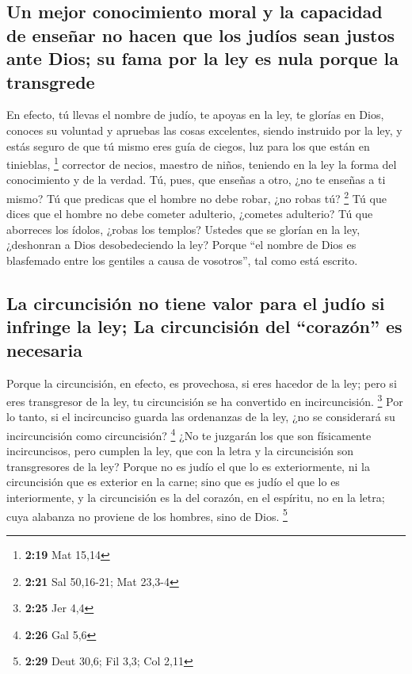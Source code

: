 \begin{paracol}{2}
\hypertarget{un-mejor-conocimiento-moral-y-la-capacidad-de-enseuxf1ar-no-hacen-que-los-juduxedos-sean-justos-ante-dios-su-fama-por-la-ley-es-nula-porque-la-transgrede}{%
\subsection{Un mejor conocimiento moral y la capacidad de enseñar no
hacen que los judíos sean justos ante Dios; su fama por la ley es nula
porque la
transgrede}\label{un-mejor-conocimiento-moral-y-la-capacidad-de-enseuxf1ar-no-hacen-que-los-juduxedos-sean-justos-ante-dios-su-fama-por-la-ley-es-nula-porque-la-transgrede}}

 En efecto, tú llevas el nombre de judío, te apoyas en la
ley, te glorías en Dios,  conoces su voluntad y apruebas
las cosas excelentes, siendo instruido por la ley,  y
estás seguro de que tú mismo eres guía de ciegos, luz para los que están
en tinieblas, \footnote{\textbf{2:19} Mat 15,14} 
corrector de necios, maestro de niños, teniendo en la ley la forma del
conocimiento y de la verdad.  Tú, pues, que enseñas a
otro, ¿no te enseñas a ti mismo? Tú que predicas que el hombre no debe
robar, ¿no robas tú? \footnote{\textbf{2:21} Sal 50,16-21; Mat 23,3-4}
 Tú que dices que el hombre no debe cometer adulterio,
¿cometes adulterio? Tú que aborreces los ídolos, ¿robas los templos?
 Ustedes que se glorían en la ley, ¿deshonran a Dios
desobedeciendo la ley?  Porque ``el nombre de Dios es
blasfemado entre los gentiles a causa de vosotros'', tal como está
escrito.

\hypertarget{la-circuncisiuxf3n-no-tiene-valor-para-el-juduxedo-si-infringe-la-ley-la-circuncisiuxf3n-del-corazuxf3n-es-necesaria}{%
\subsection{La circuncisión no tiene valor para el judío si infringe la
ley; La circuncisión del ``corazón'' es
necesaria}\label{la-circuncisiuxf3n-no-tiene-valor-para-el-juduxedo-si-infringe-la-ley-la-circuncisiuxf3n-del-corazuxf3n-es-necesaria}}

 Porque la circuncisión, en efecto, es provechosa, si
eres hacedor de la ley; pero si eres transgresor de la ley, tu
circuncisión se ha convertido en incircuncisión. \footnote{\textbf{2:25}
  Jer 4,4}  Por lo tanto, si el incircunciso guarda las
ordenanzas de la ley, ¿no se considerará su incircuncisión como
circuncisión? \footnote{\textbf{2:26} Gal 5,6}  ¿No te
juzgarán los que son físicamente incircuncisos, pero cumplen la ley, que
con la letra y la circuncisión son transgresores de la ley?
 Porque no es judío el que lo es exteriormente, ni la
circuncisión que es exterior en la carne;  sino que es
judío el que lo es interiormente, y la circuncisión es la del corazón,
en el espíritu, no en la letra; cuya alabanza no proviene de los
hombres, sino de Dios. \footnote{\textbf{2:29} Deut 30,6; Fil 3,3; Col
  2,11}


\end{paracol}
